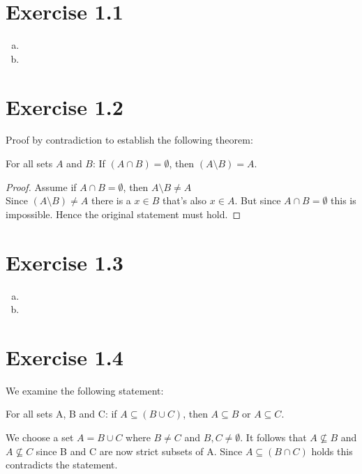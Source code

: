 \documentclass{article} %
\newcommand{\homeworkNumber}{1}
\begin{document}
\section*{Exercise \homeworkNumber.1}

\begin{enumerate}[(a)]
	\item
	\item
\end{enumerate}



\section*{Exercise \homeworkNumber.2}
    Proof by contradiction to establish the following theorem:
    \begin{center}
        For all sets $A$ and $B$: If $(A \cap B) = \emptyset$, then $(A \setminus B) = A$.
    \end{center}
    \begin{proof}
        Assume if $A \cap B = \emptyset$, then $A\setminus B \neq A$ \\
        Since $(A \setminus B) \neq A$ there is a $x \in B$ that's also $x \in A$. But since $A \cap B = \emptyset$ this is impossible. Hence the original statement must hold.
    \end{proof}



\section*{Exercise \homeworkNumber.3}

\begin{enumerate}[(a)]
	\item
	\item
\end{enumerate}



\section*{Exercise \homeworkNumber.4}
    We examine the following statement:
    \begin{center}
        For all sets A, B and C: if $A \subseteq (B \cup C)$, then $A \subseteq B$ or $A \subseteq C$.
    \end{center}
        We choose a set $A = B \cup C$ where $B \neq C$ and $B,C \neq \emptyset$. It follows that $A \not\subseteq B$ and $A \not\subseteq C$ since B and C are now strict subsets of A. Since $A \subseteq (B \cap C)$ holds this contradicts the statement.
\end{document}
